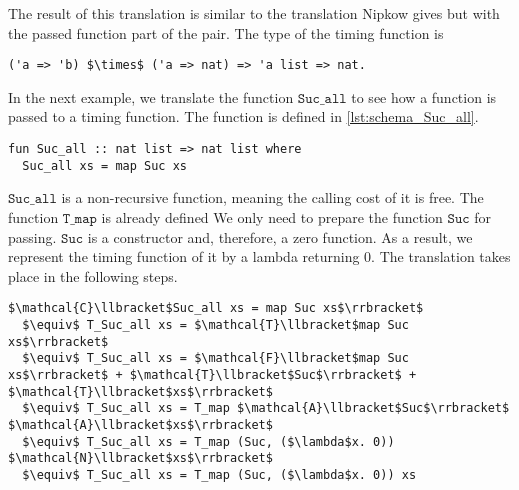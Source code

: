 The result of this translation is similar to the translation Nipkow gives but with the passed function part of the pair.
The type of the timing function is
\begin{lstlisting}[language=translation,mathescape=true,keepspaces]
  ('a => 'b) $\times$ ('a => nat) => 'a list => nat.
\end{lstlisting}

In the next example, we translate the function $\texttt{Suc\_all}$ to see how a function is passed to a timing function.
The function is defined in \autoref{lst:schema_Suc_all}.

\begin{lstlisting}[language=isabelle,caption=Example function increasing every element in list of natural numbers,label=lst:schema_Suc_all]
fun Suc_all :: nat list => nat list where
  Suc_all xs = map Suc xs
\end{lstlisting}

$\texttt{Suc\_all}$ is a non-recursive function, meaning the calling cost of it is free.
The function $\texttt{T\_map}$ is already defined
We only need to prepare the function $\texttt{Suc}$ for passing.
$\texttt{Suc}$ is a constructor and, therefore, a zero function.
As a result, we represent the timing function of it by a lambda returning $0$.
The translation takes place in the following steps.
\begin{lstlisting}[mathescape=true,language=translation]
  $\mathcal{C}\llbracket$Suc_all xs = map Suc xs$\rrbracket$
  $\equiv$ T_Suc_all xs = $\mathcal{T}\llbracket$map Suc xs$\rrbracket$
  $\equiv$ T_Suc_all xs = $\mathcal{F}\llbracket$map Suc xs$\rrbracket$ + $\mathcal{T}\llbracket$Suc$\rrbracket$ + $\mathcal{T}\llbracket$xs$\rrbracket$
  $\equiv$ T_Suc_all xs = T_map $\mathcal{A}\llbracket$Suc$\rrbracket$ $\mathcal{A}\llbracket$xs$\rrbracket$
  $\equiv$ T_Suc_all xs = T_map (Suc, ($\lambda$x. 0)) $\mathcal{N}\llbracket$xs$\rrbracket$
  $\equiv$ T_Suc_all xs = T_map (Suc, ($\lambda$x. 0)) xs
\end{lstlisting}
